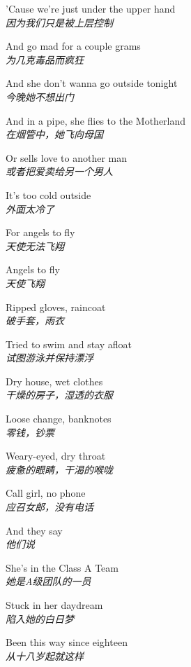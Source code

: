 \begin{spacing}{1.5}
\begin{flushleft}
'Cause we're just under the upper hand\\
\textit{因为我们只是被上层控制}\lyricspace

And go mad for a couple grams\\
\textit{为几克毒品而疯狂}\lyricspace

And she don't wanna go outside tonight\\
\textit{今晚她不想出门}\lyricspace

And in a pipe, she flies to the Motherland\\
\textit{在烟管中，她飞向母国}\lyricspace

Or sells love to another man\\
\textit{或者把爱卖给另一个男人}\lyricspace

It's too cold outside\\
\textit{外面太冷了}\lyricspace

For angels to fly\\
\textit{天使无法飞翔}\lyricspace

Angels to fly\\
\textit{天使飞翔}\lyricspace

Ripped gloves, raincoat\\
\textit{破手套，雨衣}\lyricspace

Tried to swim and stay afloat\\
\textit{试图游泳并保持漂浮}\lyricspace

Dry house, wet clothes\\
\textit{干燥的房子，湿透的衣服}\lyricspace

Loose change, banknotes\\
\textit{零钱，钞票}\lyricspace

Weary-eyed, dry throat\\
\textit{疲惫的眼睛，干渴的喉咙}\lyricspace

Call girl, no phone\\
\textit{应召女郎，没有电话}\lyricspace

And they say\\
\textit{他们说}\lyricspace

She's in the Class A Team\\
\textit{她是A级团队的一员}\lyricspace

Stuck in her daydream\\
\textit{陷入她的白日梦}\lyricspace

Been this way since eighteen\\
\textit{从十八岁起就这样}\lyricspace


\end{flushleft}
\end{spacing}
